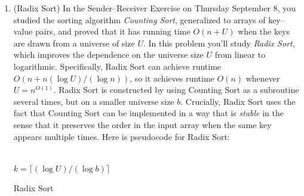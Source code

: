 \documentclass[11pt]{article}
\begin{document}
\begin{enumerate}
\begin{proof}
\begin{enumerate}
\item $| f(x) |$ is either $k$ or $\bot$. We are guaranteed that an answer we return will have $k$ terms by the pseudocode; this happens when $x$ is expressible in base $b$ with fewer than or equal to $k$ digits. Otherwise, we return $\bot$ because we can't fully express $x$.

\item This does not follow - suppose $f, f'$ are the same function but $\Pi$ requires that we return $\bot$ when $n \neq 0$ at the end of our loop while $\Pi'$ does not. Then obviously the algorithm does not solve the second problem. If we remove the ability for $f(x) = \emptyset$, then $\Pi$ always returns some value in $\mathcal{O}$ (because it can never return $\bot$). Then $f(x), f'(x)$ both return something of the same size because their outputs are in $\mathcal{O}$. Since $f(x) \supseteq f' (x)$ and $| f(x) | = | f'(x) |$, $f(x) = f'(x)$ and so now the same algorithm $A$ solves both problems.

\end{enumerate}
\end{proof}

\newpage

\item (Radix Sort) In the Sender--Receiver Exercise on Thursday September 8, you studied the sorting algorithm {\em Counting Sort}, generalized to arrays of key--value pairs, and proved that it has running time $O(n+U)$ when the keys are drawn from a universe of size $U$. In this problem you'll study {\em Radix Sort}, which improves the dependence on the universe size $U$ from linear to logarithmic.  Specifically, Radix Sort can achieve runtime $O(n+n(\log U)/(\log n))$, so it achieves runtime $O(n)$ whenever $U = n^{O(1)}$.  
Radix Sort is constructed by using Counting Sort as a subroutine several times, but on a smaller universe size $b$.
Crucially, Radix Sort uses the fact that Counting Sort can be implemented in a way that is {\em stable} in the sense that it preserves the order in the input array when the same key appears multiple times.  Here is pseudocode for Radix Sort:

\begin{algorithm}[H]
\\
$k=\lceil (\log U)/(\log b)\rceil$\;
\caption{Radix Sort}
\end{algorithm}


\end{enumerate}
\end{document}
